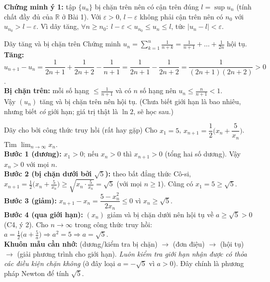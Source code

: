 \documentclass[11pt, a4paper, twoside]{article}
\newcommand{\RR}{\mathbb{R}}
\newcommand{\eps}{\varepsilon}
\newcommand{\limn}{\lim_{n\to\infty}}
\begin{document}
\vspace{0.2cm}
\textbf{Chứng minh ý 1:} tập $\{u_n\}$ bị chặn trên nên có cận trên đúng $l=\sup u_n$ (tính chất đầy đủ của $\RR$ ở Bài 1). Với $\eps>0$, $l-\eps$ không phải cận trên nên có $n_0$ với $u_{n_0}>l-\eps$. Vì dãy tăng, $\forall n\ge n_0:\ l-\eps<u_{n_0}\le u_n\le l$, tức $|u_n-l|<\eps$.
\vspace{0.2cm}
\newpage
\begin{vd}{Dãy tăng và bị chặn trên}
Chứng minh $u_n=\displaystyle\sum_{k=1}^n\frac1{n+k}=\frac1{n+1}+\dots+\frac1{2n}$ hội tụ.\\
\textbf{Tăng:} $u_{n+1}-u_n=\dfrac1{2n+1}+\dfrac1{2n+2}-\dfrac1{n+1}=\dfrac1{2n+1}-\dfrac1{2n+2}=\dfrac1{(2n+1)(2n+2)}>0$.\\
\textbf{Bị chặn trên:} mỗi số hạng $\le\frac1{n+1}$ và có $n$ số hạng nên $u_n\le\frac n{n+1}<1$.\\
Vậy $(u_n)$ tăng và bị chặn trên nên hội tụ. (Chưa biết giới hạn là bao nhiêu, nhưng biết \emph{có} giới hạn; giá trị thật là $\ln2$, sẽ học sau.)
\end{vd}
\vspace{0.2cm}
\begin{vd}{Dãy cho bởi công thức truy hồi (rất hay gặp)}
Cho $x_1=5$, $x_{n+1}=\dfrac12\Big(x_n+\dfrac5{x_n}\Big)$. Tìm $\limn x_n$.\\
\textbf{Bước 1 (dương):} $x_1>0$; nếu $x_n>0$ thì $x_{n+1}>0$ (tổng hai số dương). Vậy $x_n>0$ với mọi $n$.\\
\textbf{Bước 2 (bị chặn dưới bởi $\sqrt5$):} theo bất đẳng thức Cô-si, $x_{n+1}=\frac12\big(x_n+\frac5{x_n}\big)\ge\sqrt{x_n\cdot\frac5{x_n}}=\sqrt5$ (với mọi $n\ge1$). Cũng có $x_1=5\ge\sqrt5$.\\
\textbf{Bước 3 (giảm):} $x_{n+1}-x_n=\dfrac{5-x_n^2}{2x_n}\le0$ vì $x_n\ge\sqrt5$.\\
\textbf{Bước 4 (qua giới hạn):} $(x_n)$ giảm và bị chặn dưới nên hội tụ về $a\ge\sqrt5>0$ (C4, ý 2). Cho $n\to\infty$ trong công thức truy hồi: $a=\frac12\big(a+\frac5a\big)\Rightarrow a^2=5\Rightarrow a=\sqrt5$.\\
\textbf{Khuôn mẫu cần nhớ:} (dương/kiểm tra bị chặn) $\to$ (đơn điệu) $\to$ (hội tụ) $\to$ (giải phương trình cho giới hạn). \emph{Luôn kiểm tra giới hạn nhận được có thỏa các điều kiện chặn không} (ở đây loại $a=-\sqrt5$ vì $a>0$). Đây chính là phương pháp Newton để tính $\sqrt5$.
\end{vd}
\end{document}
